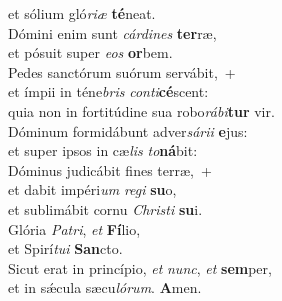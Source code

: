 \evenverse et sólium gló\textit{ri}\textit{æ} \textbf{té}neat.\\
\oddverse Dómini enim sunt \textit{cár}\textit{di}\textit{nes} \textbf{ter}ræ,~\*\\
\oddverse et pósuit super \textit{e}\textit{os} \textbf{or}bem.\\
\evenverse Pedes sanctórum suórum servábit,~+\\
\evenverse  et ímpii in téne\textit{bris} \textit{con}\textit{ti}\textbf{cé}scent:~\*\\
\evenverse quia non in fortitúdine sua robo\textit{rá}\textit{bi}\textbf{tur} vir.\\
\oddverse Dóminum formidábunt adver\textit{sá}\textit{ri}\textit{i} \textbf{e}jus:~\*\\
\oddverse et super ipsos in cæ\textit{lis} \textit{to}\textbf{ná}bit:\\
\evenverse Dóminus judicábit fines terræ,~+\\
\evenverse  et dabit impéri\textit{um} \textit{re}\textit{gi} \textbf{su}o,~\*\\
\evenverse et sublimábit cornu \textit{Chri}\textit{sti} \textbf{su}i.\\
\oddverse Glória \textit{Pa}\textit{tri}, \textit{et} \textbf{Fí}lio,~\*\\
\oddverse et Spirí\textit{tu}\textit{i} \textbf{San}cto.\\
\evenverse Sicut erat in princípio, \textit{et} \textit{nunc}, \textit{et} \textbf{sem}per,~\*\\
\evenverse et in sǽcula sæcu\textit{ló}\textit{rum}. \textbf{A}men.\\
